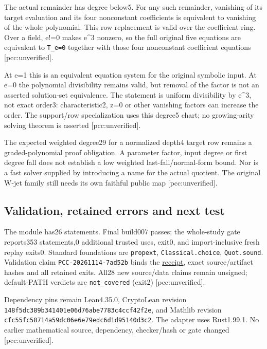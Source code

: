 \documentclass[
  10pt,
]{article}
\begin{document}
The actual remainder has degree below5. For any such remainder,
vanishing of its target evaluation and its four nonconstant coefficients
is equivalent to vanishing of the whole polynomial. This row replacement
is valid over the coefficient ring. Over a field, e!=0 makes e\^{}3
nonzero, so the full original five equations are equivalent to
\texttt{T\_e=0} together with those four nonconstant coefficient
equations {[}pcc:unverified{]}.

At e=1 this is an equivalent equation system for the original symbolic
input. At e=0 the polynomial divisibility remains valid, but removal of
the factor is not an asserted solution-set equivalence. The statement is
uniform divisibility by e\^{}3, not exact order3: characteristic2, z=0
or other vanishing factors can increase the order. The support/row
specialization uses this degree5 chart; no growing-arity solving theorem
is asserted {[}pcc:unverified{]}.

The expected weighted degree29 for a normalized depth4 target row
remains a graded-polynomial proof obligation. A parameter factor, input
degree or first degree fall does not establish a low weighted
last-fall/normal-form bound. Nor is a fast solver supplied by
introducing a name for the actual quotient. The original W-jet family
still needs its own faithful public map {[}pcc:unverified{]}.

\subsection{Validation, retained errors and next
test}\label{validation-retained-errors-and-next-test}

The module has26 statements. Final build007 passes; the whole-study gate
reports353 statements,0 additional trusted uses, exit0, and
import-inclusive fresh replay exits0. Standard foundations are
\texttt{propext}, \texttt{Classical.choice}, \texttt{Quot.sound}.
Validation claim \texttt{PCC-20261114-7ad52b} binds the
\href{../target-fiber-evidence/validation-001.json}{receipt}, exact
source/artifact hashes and all retained exits. All28 new source/data
claims remain unsigned; default-PATH verdicts are \texttt{not\_covered}
(exit2) {[}pcc:unverified{]}.

Dependency pins remain Lean4.35.0, CryptoLean revision
\texttt{148f5dc389b341401e06d76abe7783c4ccf42f2e}, and Mathlib revision
\texttt{cfc55fc58714a59dc06e6e79edc6d1d95140d3c2}. The adapter uses
Rust1.99.1. No earlier mathematical source, dependency, checker/hash or
gate changed {[}pcc:unverified{]}.
\end{document}
